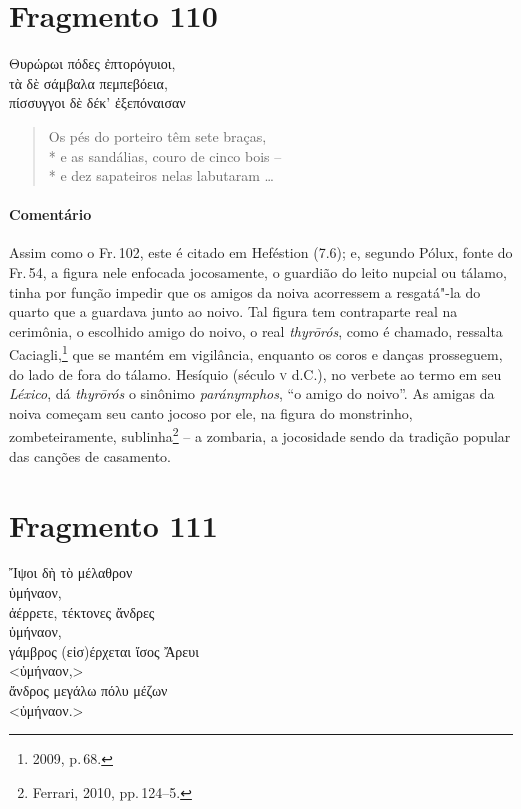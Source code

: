 {\section{Fragmento 110}

\begin{gkverse}
Θυρώρωι πόδες ἐπτορόγυιοι,\\
τὰ δὲ σάμβαλα πεμπεβόεια,\\
πίσσυγγοι δὲ δέκ’ ἐξεπόναισαν
\end{gkverse}

\begin{verse}
Os pés do porteiro têm sete braças,\\*
e as sandálias, couro de cinco bois -- \\*
e dez sapateiros nelas labutaram \ldots{}
\end{verse}

\medskip

{\paragraph{Comentário} Assim como o Fr.\,102, este é citado em Heféstion (7.6); e, segundo Pólux, fonte do Fr.\,54, a figura nele enfocada jocosamente, o guardião do leito nupcial ou tálamo, 
tinha por função impedir que os amigos da noiva acorressem a resgatá"-la do
quarto que a guardava junto ao noivo.
Tal figura tem contraparte real na cerimônia, o escolhido amigo do noivo, o real \textit{thyrōrós}, como é chamado, ressalta Caciagli,\footnote{2009, p.\,68.} que se mantém em vigilância, enquanto os coros e danças prosseguem, do lado de fora do tálamo. Hesíquio (século \textsc{v} d.C.), no verbete ao termo em seu \textit{Léxico}, dá \textit{thyrōrós} o sinônimo \textit{paránymphos}, ``o amigo do noivo''. As amigas da noiva começam seu canto jocoso por ele, na figura do monstrinho, zombeteiramente, sublinha\footnote{Ferrari, 2010, pp.\,124--5.} -- a zombaria, a jocosidade sendo da tradição popular das canções de casamento.}


\section{Fragmento 111}

\begin{gkverse}
Ἴψοι δὴ τὸ μέλαθρον\\
ὐμήναον,\\
ἀέρρετε, τέκτονες ἄνδρες\\
ὐμήναον,\\
γάμβρος \dagger{}(εἰσ)έρχεται ἴσος Ἄρευι\dagger{}\\
<ὐμήναον,>\\
ἄνδρος μεγάλω πόλυ μέζων\\
<ὐμήναον.>
\end{gkverse}

}
